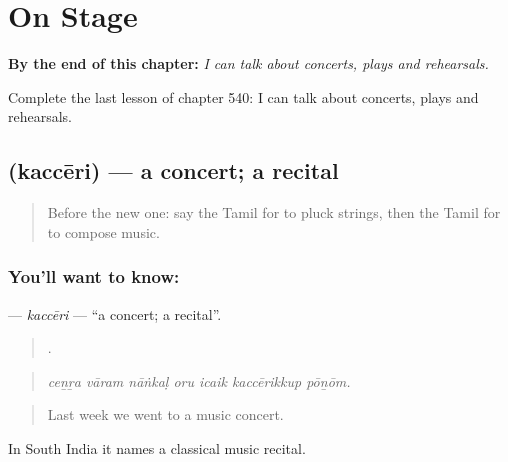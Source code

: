 
\chapter{On Stage}
\label{ch:ta-on-stage}

\begin{chapteropening}
\textbf{By the end of this chapter:} \emph{I can talk about concerts, plays and rehearsals.}

Complete the last lesson of chapter 540: I can talk about concerts, plays and rehearsals.
\end{chapteropening}

\section[\texorpdfstring{\ta{கச்சேரி} (kaccēri)}{கச்சேரி (kaccēri)}]{ (kaccēri) — a concert; a recital}

\label{lesson:TA-C540-kacceri}



\begin{quote}
Before the new one: say the Tamil for to pluck strings, then the Tamil for to compose music.
\end{quote}

\subsection*{You'll want to know: }
\textbf{} — \emph{kaccēri} — \textquotedblleft{}a concert; a recital\textquotedblright{}.

\begin{quote}
      .
\end{quote}

\begin{quote}
\emph{ceṉṟa vāram nāṅkaḷ oru icaik kaccērikkup pōṉōm.}
\end{quote}

\begin{quote}
Last week we went to a music concert.
\end{quote}

In South India it names a classical music recital.

